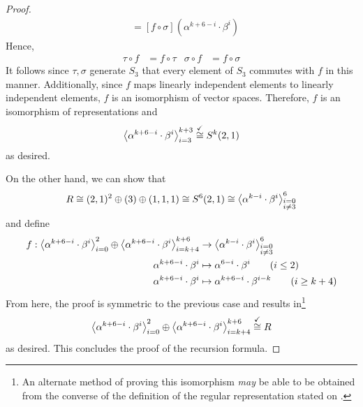 \documentclass[../psets.tex]{subfiles}
\begin{document}
\begin{enumerate}
\begin{enumerate}
\begin{proof}
\begin{align*}
                &= [f\circ\sigma](\alpha^{k+6-i}\cdot\beta^i)
            \end{align*}
            Hence,
            \begin{align*}
                \tau\circ f &= f\circ\tau&
                \sigma\circ f &= f\circ\sigma
            \end{align*}
            It follows since $\tau,\sigma$ generate $S_3$ that every element of $S_3$ commutes with $f$ in this manner. Additionally, since $f$ maps linearly independent elements to linearly independent elements, $f$ is an isomorphism of vector spaces. Therefore, $f$ is an isomorphism of representations and
            \begin{equation*}
                \left\langle{\alpha^{k+6-i}\cdot\beta^i}\right\rangle_{i=3}^{k+3} \stackrel{\checkmark}{\cong} S^k(2,1)
            \end{equation*}
            as desired.\par
            On the other hand, we can show that
            \begin{equation*}
                R \cong (2,1)^2\oplus(3)\oplus(1,1,1)
                \cong S^6(2,1)
                \cong \left\langle{\alpha^{k-i}\cdot\beta^i}\right\rangle_{\substack{i=0\\i\neq 3}}^6
            \end{equation*}
            and define
            \begin{align*}
                f:\left\langle{\alpha^{k+6-i}\cdot\beta^i}\right\rangle_{i=0}^2\oplus\left\langle{\alpha^{k+6-i}\cdot\beta^i}\right\rangle_{i=k+4}^{k+6} &\to \left\langle{\alpha^{k-i}\cdot\beta^i}\right\rangle_{\substack{i=0\\i\neq 3}}^6\\
                \alpha^{k+6-i}\cdot\beta^i &\mapsto \alpha^{6-i}\cdot\beta^i\tag{$i\leq 2$}\\
                \alpha^{k+6-i}\cdot\beta^i &\mapsto \alpha^{k+6-i}\cdot\beta^{i-k}\tag{$i\geq k+4$}
            \end{align*}
            From here, the proof is symmetric to the previous case and results in\footnote{An alternate method of proving this isomorphism \emph{may} be able to be obtained from the converse of the definition of the regular representation stated on \textcite[5]{bib:Serre}.}
            \begin{equation*}
                \left\langle{\alpha^{k+6-i}\cdot\beta^i}\right\rangle_{i=0}^2\oplus\left\langle{\alpha^{k+6-i}\cdot\beta^i}\right\rangle_{i=k+4}^{k+6} \stackrel{\checkmark}{\cong} R
            \end{equation*}
            as desired. This concludes the proof of the recursion formula.\par

\end{proof}
\end{enumerate}
\end{enumerate}
\end{document}
